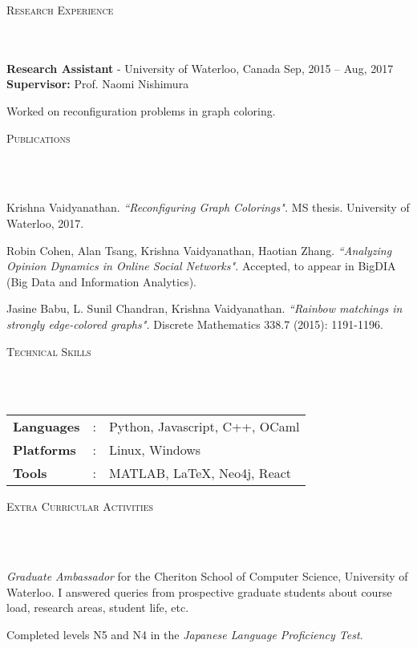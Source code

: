 \documentclass{article}
\newcommand{\header}[1]{{
\hspace*{-15pt}\vspace*{6pt} \textsc{#1}} \vspace*{-6pt} 
\lineunder
}
\newcommand{\lineunder}{
\vspace*{-8pt} \\ \hspace*{-18pt} 
\hrulefill \\
}
\newcommand{\employer}[4]{{
\vspace*{2pt}%
\textbf{#1} - #2 \hfill #3\\ #4 \vspace*{2pt}}
}
\renewcommand{\labelitemii}{
$\vcenter{\hbox{\tiny$\bullet$}}$\hspace*{-3pt}
}
\newenvironment{bullet-list-major}{
\begin{list}{\labelitemii}{\setlength\leftmargin{3pt} 
\topsep 0pt \itemsep -2pt}}{\vspace*{4pt}\end{list}
}
\newenvironment{bullet-list-minor}{
\begin{list}{\labelitemii}{\setlength\leftmargin{15pt} 
\topsep 0pt \itemsep -2pt}}{\vspace*{4pt}\end{list}
}
\begin{document}
\vspace*{4pt}%
\header{Research Experience}
\employer{Research Assistant}{University of Waterloo, Canada}{Sep, 2015 --
      Aug, 2017}{\textbf{Supervisor:} Prof. Naomi Nishimura}
\begin{bullet-list-minor}
\item Worked on reconfiguration problems in graph coloring. 
\end{bullet-list-minor}

\vspace*{4pt}%
\header{Publications}
\begin{bullet-list-major}
\item Krishna Vaidyanathan. \textit{``Reconfiguring Graph Colorings".} MS thesis. University of Waterloo, 2017. 
\item Robin Cohen, Alan Tsang, Krishna Vaidyanathan, Haotian Zhang. 
    \textit{``Analyzing Opinion Dynamics in Online Social Networks".} Accepted, to appear in 
        BigDIA (Big Data and Information Analytics). 
\item Jasine  Babu,  L.  Sunil  Chandran, Krishna  Vaidyanathan.
    \textit{``Rainbow matchings in strongly edge-colored graphs".} Discrete Mathematics 338.7 (2015):  1191-1196.
\end{bullet-list-major}

\vspace*{4pt}%
\header{Technical Skills}
\begin{tabular}{l l l}

\textbf{Languages}&: & Python, Javascript, C++, OCaml\\
\textbf{Platforms}&:  & Linux, Windows\\
\textbf{Tools}&:     &MATLAB, \LaTeX, Neo4j, React
\end{tabular}


\vspace*{4pt}%
\header{Extra Curricular Activities}
    \begin{bullet-list-major}
    \item \textit{Graduate Ambassador} for the Cheriton School of Computer Science,
        University of Waterloo. I answered queries from prospective graduate
        students about course load, research areas, student life, etc.
    \item Completed levels N5 and N4 in the \textit{Japanese Language
            Proficiency Test}.
    \end{bullet-list-major}
\end{document}
